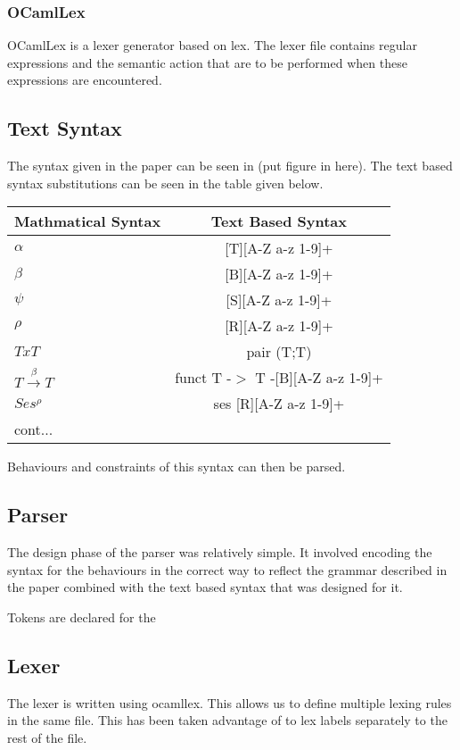 \documentclass[12pt]{article}
\begin{document}
\subsubsection{OCamlLex}
OCamlLex is a lexer generator based on lex. The lexer file contains regular expressions and the semantic action that are to be performed when these expressions are encountered. 

\subsection{Text Syntax}

The syntax given in the paper can be seen in (put figure in here). The text based syntax substitutions can be seen in the table given below. 

\begin{tabular}{l c }
Mathmatical Syntax & Text Based Syntax \\
\hline
$\alpha$ & [T][A-Z a-z 1-9]+ \\
$\beta$ & [B][A-Z a-z 1-9]+ \\
$\psi$ & [S][A-Z a-z 1-9]+ \\
$\rho$ & [R][A-Z a-z 1-9]+ \\
$T x T$ & pair (T;T) \\
$ T\overset{\beta}{\rightarrow}T $ & funct T -$>$ T -[B][A-Z a-z 1-9]+ \\
$Ses^\rho$ & ses [R][A-Z a-z 1-9]+ \\
cont...

\end{tabular}

Behaviours and constraints of this syntax can then be parsed. 

\subsection{Parser}

The design phase of the parser was relatively simple. It involved encoding the syntax for the behaviours in the correct way to reflect the grammar described in the paper combined with the text based syntax that was designed for it. 

Tokens are declared for the  

\subsection{Lexer}

The lexer is written using ocamllex. This allows us to define multiple lexing rules in the same file. This has been taken advantage of to lex labels separately to the rest of the file. 
\end{document}
